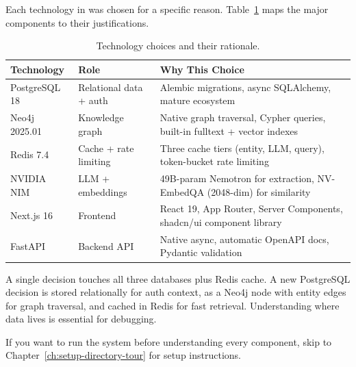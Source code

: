 Each technology in \sysname{} was chosen for a specific reason.
Table~\ref{tab:tech-stack} maps the major components to their justifications.

\begin{table}[ht]
\centering
\caption{Technology choices and their rationale.}
\label{tab:tech-stack}
\begin{tabularx}{\textwidth}{l l X}
\toprule
\textbf{Technology} & \textbf{Role} & \textbf{Why This Choice} \\
\midrule
PostgreSQL 18 &
    Relational data + auth &
    Alembic migrations, async SQLAlchemy, mature ecosystem \\
Neo4j 2025.01 &
    Knowledge graph &
    Native graph traversal, Cypher queries, built-in fulltext + vector indexes \\
Redis 7.4 &
    Cache + rate limiting &
    Three cache tiers (entity, LLM, query), token-bucket rate limiting \\
NVIDIA NIM &
    LLM + embeddings &
    49B-param Nemotron for extraction, NV-EmbedQA (2048-dim) for similarity \\
Next.js 16 &
    Frontend &
    React 19, App Router, Server Components, shadcn/ui component library \\
FastAPI &
    Backend API &
    Native async, automatic OpenAPI docs, Pydantic validation \\
\bottomrule
\end{tabularx}
\end{table}

\begin{keyinsight}
A single decision touches all three databases plus Redis cache.  A new
PostgreSQL decision is stored relationally for auth context, as a Neo4j node
with entity edges for graph traversal, and cached in Redis for fast
retrieval.  Understanding where data lives is essential for debugging.
\end{keyinsight}

\begin{skipahead}
If you want to run the system before understanding every component,
skip to Chapter~\ref{ch:setup-directory-tour} for setup instructions.
\end{skipahead}
